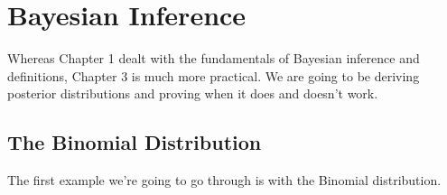\documentclass[
]{book}
\theoremstyle{definition}
\theoremstyle{definition}
\theoremstyle{definition}
\theoremstyle{definition}
\theoremstyle{remark}
\begin{document}
\hypertarget{bayesian-inference}{%
\chapter{Bayesian Inference}\label{bayesian-inference}}

Whereas Chapter 1 dealt with the fundamentals of Bayesian inference and definitions, Chapter 3 is much more practical. We are going to be deriving posterior distributions and proving when it does and doesn't work.

\hypertarget{the-binomial-distribution}{%
\section{The Binomial Distribution}\label{the-binomial-distribution}}

The first example we're going to go through is with the Binomial distribution.
\end{document}
